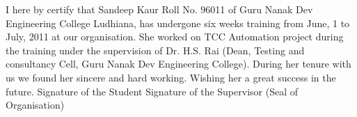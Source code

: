 \begin{Large}
\end{Large}
I here by certify that Sandeep Kaur Roll No. 96011 of Guru Nanak Dev Engineering College Ludhiana, has undergone six weeks training from June, 1 to July, 2011 at our organisation. She worked on TCC Automation project during the training under the supervision of Dr. H.S. Rai (Dean, Testing and consultancy Cell, Guru Nanak Dev Engineering College). During her tenure with us we found her sincere and hard working. Wishing her a great success in the future.
\student
Signature of the Student
\supervisor
Signature of the Supervisor 
\stamp
(Seal of Organisation)
\newpage

